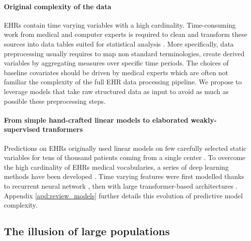 \documentclass[french,12pt,twoside,a4paper]{book}
\begin{document}
\paragraph{Original complexity of the data}

EHRs contain time varying variables with a high cardinality. Time-consuming work
from medical and computer experts is required to clean and transform these
sources into data tables suited for statistical analysis
\citep{bacry2020scalpel3,hripcsak2015observational}. More specifically, data
preprocessing usually requires to map non standard terminologies, create derived
variables by aggregating measures over specific time periods. The choices of
baseline covariates should be driven by medical experts which are often not
familiar the complexity of the full EHR data processing pipeline. We propose to
leverage models that take raw structured data as input to avoid as much as possible these
preprocessing steps.


\paragraph{From simple hand-crafted linear models to elaborated weakly-supervised tranformers}

Predictions on EHRs originally used linear models on few carefully selected
static variables for tens of thousand patients coming from a single center
\citep{goldstein2017opportunities}. To overcome the high cardinality of EHRs
medical vocabularies, a series of deep learning methods have been developed
\citep{shickel2017deep}. Time varying features were first modelled thanks to
recurrent neural network \citep{lipton2016learning}, then with large transformer-based
architectures \citep{li2020behrt}. Appendix \ref{apd:review_models} further
details this evolution of predictive model complexity.

\subsection{The illusion of large populations}%
\label{subsec:predictive_models:low_prevalence}%

\end{document}

